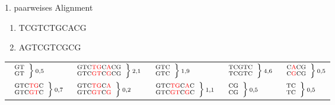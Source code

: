 \documentclass[wide,xcolor={x11names},hyperref={colorlinks=false},pantone312]{beamer}
\begin{document}
\begin{frame}[t]{1. paarweises Alignment}
	\small
	\ttfamily
	\begin{enumerate}
		\item TCGTCTGCACG
		\item AGTCGTCGCG
		\normalfont
	\end{enumerate}
	\begin{tabular*}{12cm}{lllll}
		\rule{0pt}{4ex}
		$ \scriptsize \left. \begin{array}{c} \mbox{GT}\\\mbox{GT} \end{array} \right \} \mbox{0,5}$ & $ \scriptsize \left. \begin{array}{c} \mbox{GTC\textcolor{red}{TG}C\textcolor{red}{A}CG}\\ \mbox{GTC\textcolor{red}{GT}C\textcolor{red}{G}CG} \end{array} \right \} \mbox{2,1}$ &
		$ \scriptsize \left. \begin{array}{c} \mbox{GTC} \\ \mbox{GTC} \end{array} \right \} \mbox{1,9}$ & $ \scriptsize \left. \begin{array}{c} \mbox{TCGTC} \\ \mbox{TCGTC} \end{array} \right \} \mbox{4,6}$ & $ \scriptsize \left. \begin{array}{c} \mbox{C\textcolor{red}{A}CG} \\ \mbox{C\textcolor{red}{G}CG} \end{array} \right \} \mbox{0,5}$ \\
		\rule{0pt}{4ex}
		$ \scriptsize \left. \begin{array}{c} \mbox{GTC\textcolor{red}{TG}C}\\ \mbox{GTC\textcolor{red}{GT}C} \end{array} \right \} \mbox{0,7}$ & $ \scriptsize \left. \begin{array}{c} \mbox{GTC\textcolor{red}{TG}C\textcolor{red}{A}}\\ \mbox{GTC\textcolor{red}{GT}C\textcolor{red}{G}} \end{array} \right \} \mbox{0,2}$ & $ \scriptsize \left. \begin{array}{c} \mbox{GTC\textcolor{red}{TG}C\textcolor{red}{A}C}\\ \mbox{GTC\textcolor{red}{GT}C\textcolor{red}{G}C} \end{array} \right \} \mbox{1,1}$ & $ \scriptsize \left. \begin{array}{c} \mbox{CG}\\\mbox{CG} \end{array} \right \} \mbox{0,5}$ & $ \scriptsize \left. \begin{array}{c} \mbox{TC}\\\mbox{TC} \end{array} \right \} \mbox{0,5}$ \\

\end{tabular*}
\end{frame}
\end{document}
